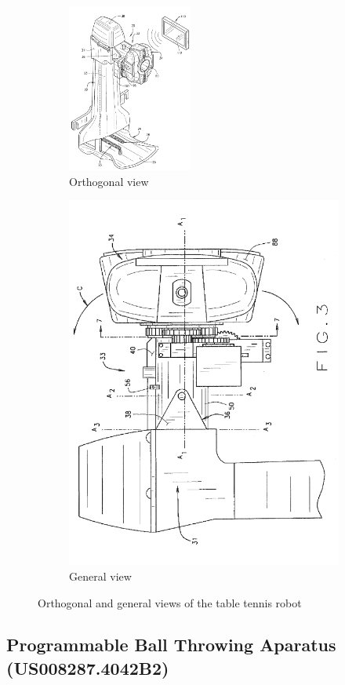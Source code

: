 \documentclass[12pt]{report}
\begin{document}
\begin{figure}[H]
    \centering
    \begin{subfigure}{0.4\textwidth}
        \centering
        \includegraphics[width=0.45\textwidth]{figures/patent3-1.png}
        \caption{Orthogonal view}
    \end{subfigure}
    \hfill
    \begin{subfigure}{0.4\textwidth}
        \centering
        \includegraphics[width=.45\textwidth]{figures/patent3-2.png}
        \caption{General view}
    \end{subfigure}
    \caption{Orthogonal and general views of the table tennis robot \cite{Thoman2022}}
\label{fig:patetn3-2}
\end{figure}

\subsection{Programmable Ball Throwing Aparatus (US008287.4042B2) \cite{Romulo2012}}
\end{document}
